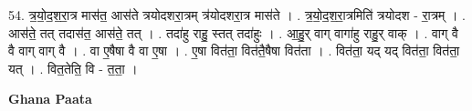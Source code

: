 \documentclass[17pt]{extarticle}
\begin{document}
54. त्र॒यो॒द॒श॒रा॒त्र मास॑त॒ आस॑ते त्रयोदशरा॒त्रम् त्र॑योदशरा॒त्र मास॑ते । . त्र॒यो॒द॒श॒रा॒त्रमिति॑ त्रयोदश - रा॒त्रम् । . आस॑ते॒ तत् तदास॑त॒ आस॑ते॒ तत् । . तदा॑हु राहु॒ स्तत् तदा॑हुः । . आ॒हु॒र् वाग् वागा॑हु राहु॒र् वाक् । . वाग् वै वै वाग् वाग् वै । . वा ए॒षैषा वै वा ए॒षा । . ए॒षा वित॑ता॒ वित॑तै॒षैषा वित॑ता । . वित॑ता॒ यद् यद् वित॑ता॒ वित॑ता॒ यत् । . वित॒तेति॒ वि - त॒ता॒ । \newline

\textbf{Ghana Paata } \newline
\end{document}
